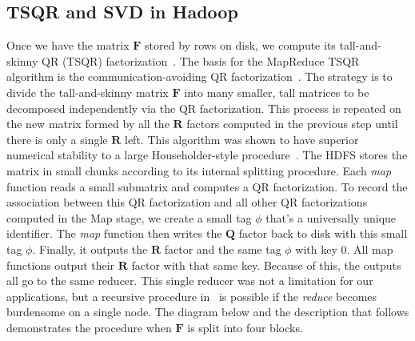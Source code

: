 \documentclass[final]{siamltex}
\providecommand{\mat}[1]{\boldsymbol{#1}}
\providecommand{\mF}{\ensuremath{\mat{F}}}
\providecommand{\mQ}{\ensuremath{\mat{Q}}}
\providecommand{\mR}{\ensuremath{\mat{R}}}
\begin{document}
\subsection{TSQR and SVD in Hadoop}
\label{sec:tssvd}

Once we have the matrix $\mF$ stored by rows on disk, we compute its
tall-and-skinny QR (TSQR)
factorization~\cite{Benson-preprint-direct-tsqr}. The basis for the
MapReduce TSQR algorithm is the communication-avoiding QR
factorization~\cite{Demmel-2012-CAQR}. The strategy is to divide the
tall-and-skinny matrix $\mF$ into many smaller, tall matrices to be
decomposed independently via the QR factorization. This process is
repeated on the new matrix formed by all the $\mR$ factors computed in
the previous step until there is only a single $\mR$ left. This
algorithm was shown to have superior numerical stability to a large
Householder-style procedure~\cite{Mori-2012-allreduce}. The HDFS
stores the matrix in small chunks according to its internal splitting
procedure. Each {\textit{map}\xspace} function reads a small submatrix and computes
a QR factorization. To record the association between
this QR factorization and all other QR factorizations computed
in the Map stage, we create a small tag $\phi$ that's a
universally unique identifier. The {\textit{map}\xspace} function then writes the $\mQ$
factor back to disk with this small tag $\phi$.  Finally, it outputs
the $\mR$ factor and the same tag $\phi$ with key $0$. All map
functions output their $\mR$ factor with that same key. Because of
this, the outputs all go to the same reducer.
This single reducer was not a limitation for our applications, but a
recursive procedure in~\cite{Benson-preprint-direct-tsqr} is possible
if the {\textit{reduce}\xspace} becomes burdensome on a single node.  The diagram below
and the description that follows demonstrates the procedure when $\mF$
is split into four blocks.
 
\end{document}
